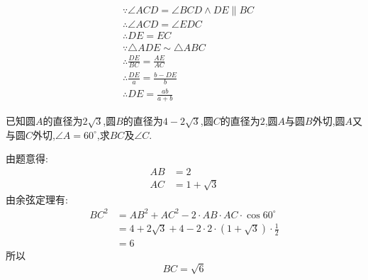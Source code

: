 \begin{questions}
	\begin{solution}
		\begin{align*}
			 & \because \angle{ACD} = \angle{BCD} \land DE \parallel BC \\
			 & \therefore \angle{ACD}=\angle{EDC}                       \\
			 & \therefore DE = EC                                       \\
			 & \because \triangle{ADE} \sim \triangle{ABC}              \\
			 & \therefore \frac{DE}{BC} = \frac{AE}{AC}                 \\
			 & \therefore \frac{DE}{a} = \frac{b-DE}{b}                 \\
			 & \therefore DE = \frac{ab}{a+b}
		\end{align*}
	\end{solution}
	\pagebreak
	\question[10]
	已知圆$A$的直径为$2\sqrt{3}$,圆$B$的直径为$4-2\sqrt{3}$,圆$C$的直径为$2$,圆$A$与圆$B$外切,圆$A$又与圆$C$外切,$\angle{A}=60^\circ$,求$BC$及$\angle{C}$.

	\begin{solution}
		\begin{center}
		\end{center}
		由题意得:
		\begin{align*}
			AB & = 2            \\
			AC & = 1 + \sqrt{3}
		\end{align*}
		由余弦定理有:
		\begin{align*}
			BC^2 & = AB^2 + AC^2 - 2\cdot AB \cdot AC \cdot \cos60^\circ           \\
			     & = 4 + 2\sqrt{3} + 4 - 2\cdot 2 \cdot (1+\sqrt{3}) \cdot \frac12 \\
			     & = 6
		\end{align*}
		所以
		\begin{equation*}
			BC = \sqrt{6}
		\end{equation*}


\end{solution}
\end{questions}
